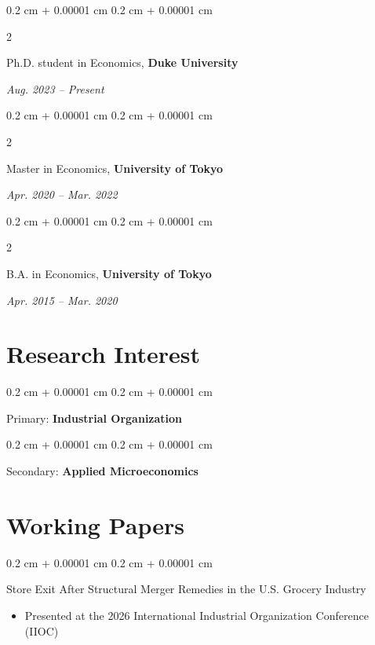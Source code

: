 \documentclass[11pt, letterpaper]{article}
\newenvironment{highlights}{
    \begin{itemize}[
        topsep=0.10 cm,
        parsep=0.10 cm,
        partopsep=0pt,
        itemsep=0pt,
        leftmargin=0.4 cm + 10pt
    ]
}{
    \end{itemize}
} %
\newenvironment{highlightsforbulletentries}{
    \begin{itemize}[
        topsep=0.10 cm,
        parsep=0.10 cm,
        partopsep=0pt,
        itemsep=0pt,
        leftmargin=10pt
    ]
}{
    \end{itemize}
} %
\newenvironment{onecolentry}{
    \begin{adjustwidth}{
        0.2 cm + 0.00001 cm
    }{
        0.2 cm + 0.00001 cm
    }
}{
    \end{adjustwidth}
} %
\newenvironment{twocolentry}[2][]{
    \onecolentry
    \def\secondColumn{#2}
    \setcolumnwidth{\fill, 4.5 cm}
    \begin{paracol}{2}
}{
    \switchcolumn \raggedleft \secondColumn
    \end{paracol}
    \endonecolentry
} %
\begin{document}
    \begin{twocolentry}{\textit{Aug. 2023 – Present}}
        Ph.D. student in Economics, \textbf{Duke University}
    \end{twocolentry}
    \vspace{0.2 cm}
    \begin{twocolentry}{\textit{Apr. 2020 – Mar. 2022}}
        Master in Economics, \textbf{University of Tokyo}
    \end{twocolentry}
    \vspace{0.2 cm}
    \begin{twocolentry}{\textit{Apr. 2015 – Mar. 2020}}
        B.A. in Economics, \textbf{University of Tokyo}
    \end{twocolentry}

    \section{Research Interest}
        
    \begin{onecolentry}
        Primary: \textbf{Industrial Organization}
    \end{onecolentry}
    \vspace{0.2 cm}
    \begin{onecolentry}
        Secondary: \textbf{Applied Microeconomics}
    \end{onecolentry}


    
    \section{Working Papers}

    \begin{onecolentry}
        Store Exit After Structural Merger Remedies in the U.S. Grocery Industry
        \begin{highlightsforbulletentries}
            \item Presented at the 2026 International Industrial Organization Conference (IIOC)
        \end{highlightsforbulletentries}
    \end{onecolentry}
    \vspace{0.2cm}
    
\end{document}
